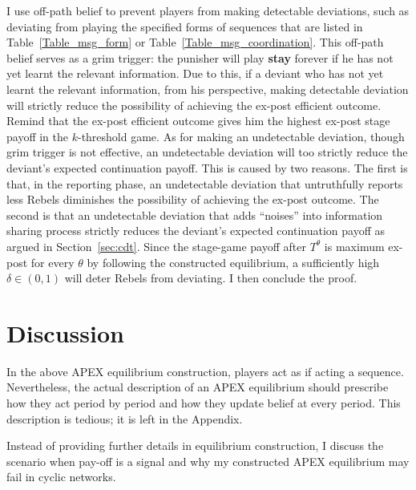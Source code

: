 \documentclass[12pt,letter]{article}
\theoremstyle{definition}
\theoremstyle{remark}
\theoremstyle{claim}
\begin{document}
I use off-path belief to prevent players from making detectable deviations, such as deviating from playing the specified forms of sequences that are listed in Table~\ref{Table_msg_form} or Table~\ref{Table_msg_coordination}. This off-path belief serves as a grim trigger: the punisher will play \textbf{stay} forever if he has not yet learnt the relevant information. Due to this, if a deviant who has not yet learnt the relevant information, from his perspective, making detectable deviation will strictly reduce the possibility of achieving the ex-post efficient outcome. Remind that the ex-post efficient outcome gives him the highest ex-post stage payoff in the $k$-threshold game. As for making an undetectable deviation, though grim trigger is not effective, an undetectable deviation will too strictly reduce the deviant's expected continuation payoff. This is caused by two reasons. The first is that, in the reporting phase, an undetectable deviation that untruthfully reports less Rebels diminishes the possibility of achieving the ex-post outcome. The second is that an undetectable deviation that adds ``noises'' into information sharing process strictly reduces the deviant's expected continuation payoff as argued in Section~\ref{sec:cdt}. Since the stage-game payoff after $T^{\theta}$ is maximum ex-post for every $\theta$ by following the constructed equilibrium, a sufficiently high $\delta\in(0,1)$ will deter Rebels from deviating. I then conclude the proof.

\section{Discussion}
\label{sec:varies}
%
%
In the above APEX equilibrium construction, players act as if acting a sequence. Nevertheless, the actual description of an APEX equilibrium should prescribe how they act period by period and how they update belief at every period. This description is tedious; it is left in the Appendix.

Instead of providing further details in equilibrium construction, I discuss the scenario when pay-off is a signal and why my constructed APEX equilibrium may fail in cyclic networks.
\end{document}
